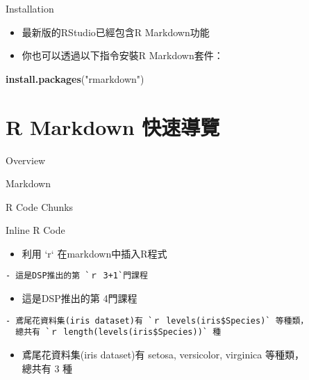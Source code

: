 \documentclass[ignorenonframetext,]{beamer}
\newenvironment{Shaded}{\begin{snugshade}}{\end{snugshade}}
\newcommand{\KeywordTok}[1]{\textcolor[rgb]{0.13,0.29,0.53}{\textbf{#1}}}
\newcommand{\StringTok}[1]{\textcolor[rgb]{0.31,0.60,0.02}{#1}}
\newcommand{\NormalTok}[1]{#1}
\providecommand{\tightlist}{%
  \setlength{\itemsep}{0pt}\setlength{\parskip}{0pt}}
\begin{document}
\begin{frame}[fragile]{Installation}

\begin{itemize}
\tightlist
\item
  最新版的RStudio已經包含R Markdown功能\\
\item
  你也可以透過以下指令安裝R Markdown套件：
\end{itemize}

\begin{Shaded}
\begin{Highlighting}[]
\KeywordTok{install.packages}\NormalTok{(}\StringTok{"rmarkdown"}\NormalTok{)}
\end{Highlighting}
\end{Shaded}

\end{frame}

\section{R Markdown 快速導覽}\label{r-markdown-}

\begin{frame}{Overview}

\end{frame}

\begin{frame}{Markdown}

\end{frame}

\begin{frame}{R Code Chunks}

\end{frame}

\begin{frame}[fragile]{Inline R Code}

\begin{itemize}
\tightlist
\item
  利用 `r` 在markdown中插入R程式
\end{itemize}

\begin{verbatim}
- 這是DSP推出的第 `ｒ 3+1`門課程  
\end{verbatim}

\begin{itemize}
\tightlist
\item
  這是DSP推出的第 4門課程
\end{itemize}

\begin{verbatim}
- 鳶尾花資料集(iris dataset)有 `ｒ levels(iris$Species)` 等種類，
  總共有 `ｒ length(levels(iris$Species))` 種
\end{verbatim}

\begin{itemize}
\tightlist
\item
  鳶尾花資料集(iris dataset)有 setosa, versicolor, virginica 等種類，\\
  總共有 3 種
\end{itemize}

\end{frame}
\end{document}
